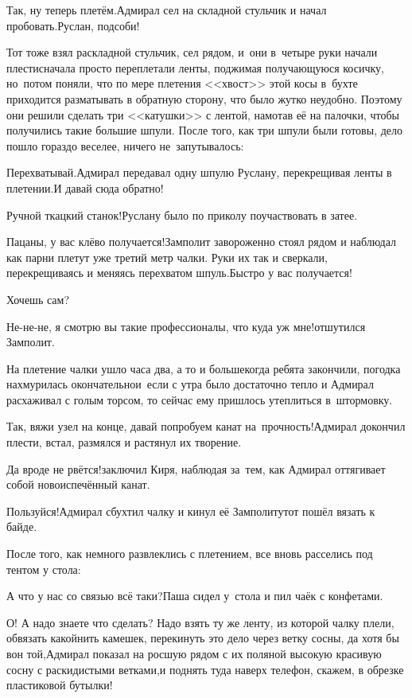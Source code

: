 \diagdash Так, ну теперь плетём.\mdash Адмирал сел на складной стульчик и начал пробовать.\mdash Руслан, подсоби!

Тот тоже взял раскладной стульчик, сел рядом, и~они в~четыре руки начали плести\mdash сначала просто переплетали ленты, поджимая получающуюся косичку, но~потом поняли, что по мере плетения <<хвост>> этой косы в~бухте приходится разматывать в обратную сторону, что было жутко неудобно. Поэтому они решили сделать три <<катушки>> с лентой, намотав её на палочки, чтобы получились такие большие шпули. После того, как три шпули были готовы, дело пошло гораздо веселее, ничего не~запутывалось:

\diagdash Перехватывай.\mdash Адмирал передавал одну шпулю Руслану, перекрещивая ленты в плетении.\mdash И давай сюда обратно!

\diagdash Ручной ткацкий станок!\mdash Руслану было по приколу поучаствовать в затее.

\diagdash Пацаны, у вас клёво получается!\mdash Замполит завороженно стоял рядом и наблюдал как парни плетут уже третий метр чалки. Руки их так и сверкали, перекрещиваясь и меняясь перехватом шпуль.\mdash Быстро у вас получается!

\diagdash Хочешь сам?

\diagdash Не-не-не, я смотрю вы такие профессионалы, что куда уж мне!\mdash отшутился Замполит.

На плетение чалки ушло часа два, а то и больше\mdash когда ребята закончили, погодка нахмурилась окончательно\mdash и~если с утра было достаточно тепло и Адмирал расхаживал с голым торсом, то сейчас ему пришлось утеплиться в~штормовку.

\diagdash Так, вяжи узел на конце, давай попробуем канат на~прочность!\mdash Адмирал докончил плести, встал, размялся и растянул их творение.

\diagdash Да вроде не рвётся!\mdash заключил Киря, наблюдая за~тем, как Адмирал оттягивает собой новоиспечённый канат.

\diagdash Пользуйся!\mdash Адмирал сбухтил чалку и кинул её Замполиту\mdash тот пошёл вязать к байде.

После того, как немного развлеклись с плетением, все вновь расселись под тентом у стола:

\diagdash А что у нас со связью всё таки?\mdash Паша сидел у~стола и пил чаёк с конфетами.

\diagdash О! А надо знаете что сделать? Надо взять ту же ленту, из которой чалку плели, обвязать какой\sdash нить камешек, перекинуть это дело через ветку сосны, да хотя бы вон той,\mdash Адмирал показал на росшую рядом с их поляной высокую красивую сосну с раскидистыми ветками,\mdash и поднять туда наверх телефон, скажем, в обрезке пластиковой бутылки!

